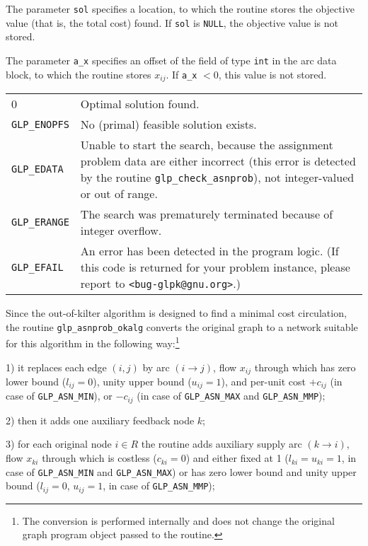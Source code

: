 \documentclass[11pt]{report}
\makeatletter
\def\para#1{\noindent{\bf#1}}
\def\returns{\para{Returns}}
\newenvironment{retlist}
{  \def\arraystretch{1.5}
   \noindent
   \begin{tabular}{@{}p{1in}@{}p{5.5in}@{}}
}
{\end{tabular}}
\makeatother
\begin{document}
The parameter \verb|sol| specifies a location, to which the routine
stores the objective value (that is, the total cost) found.
If \verb|sol| is \verb|NULL|, the objective value is not stored.

The parameter \verb|a_x| specifies an offset of the field of type
\verb|int| in the arc data block, to which the routine stores $x_{ij}$.
If \verb|a_x| $<0$, this value is not stored.

\returns

\begin{retlist}
0 & Optimal solution found.\\

\verb|GLP_ENOPFS| & No (primal) feasible solution exists.\\

\verb|GLP_EDATA| & Unable to start the search, because the assignment
problem data are either incorrect (this error is detected by the
routine \verb|glp_check_asnprob|), not integer-valued or out of range.\\

\verb|GLP_ERANGE| & The search was prematurely terminated because of
integer overflow.\\

\verb|GLP_EFAIL| & An error has been detected in the program logic.
(If this code is returned for your problem instance, please report to
\verb|<bug-glpk@gnu.org>|.)\\
\end{retlist}

\para{Comments}

Since the out-of-kilter algorithm is designed to find a minimal cost
circulation, the routine \verb|glp_asnprob_okalg| converts the original
graph to a network suitable for this algorithm in the following
way:\footnote{The conversion is performed internally and does not
change the original graph program object passed to the routine.}

1) it replaces each edge $(i,j)$ by arc $(i\rightarrow j)$,
flow $x_{ij}$ through which has zero lower bound ($l_{ij}=0$), unity
upper bound ($u_{ij}=1$), and per-unit cost $+c_{ij}$ (in case of
\verb|GLP_ASN_MIN|), or $-c_{ij}$ (in case of \verb|GLP_ASN_MAX| and
\verb|GLP_ASN_MMP|);

2) then it adds one auxiliary feedback node $k$;

3) for each original node $i\in R$ the routine adds auxiliary supply
arc $(k\rightarrow i)$, flow $x_{ki}$ through which is costless
($c_{ki}=0$) and either fixed at 1 ($l_{ki}=u_{ki}=1$, in case of
\verb|GLP_ASN_MIN| and \verb|GLP_ASN_MAX|) or has zero lower bound and
unity upper bound ($l_{ij}=0$, $u_{ij}=1$, in case of
\verb|GLP_ASN_MMP|);
\end{document}
